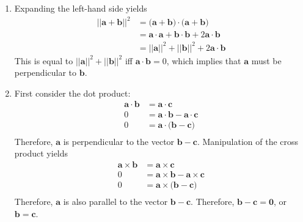 \item
\begin{enumerate}
\item Expanding the left-hand side yields
\begin{align*}
||\mathbf{a} + \mathbf{b}||^2 &= \big(\mathbf{a} + \mathbf{b}\big)\cdot\big(\mathbf{a} + \mathbf{b}\big) \\
&= \mathbf{a}\cdot\mathbf{a} + \mathbf{b}\cdot\mathbf{b} + 2\mathbf{a}\cdot\mathbf{b}\\
&= ||\mathbf{a}||^2 + ||\mathbf{b}||^2 + 2\mathbf{a}\cdot\mathbf{b}
\end{align*}
This is equal to $ ||\mathbf{a}||^2 + ||\mathbf{b}||^2$ iff $\mathbf{a}\cdot\mathbf{b}=0$, which implies that $\mathbf{a}$ must be perpendicular to $\mathbf{b}$.
\item First consider the dot product:
\begin{align*}
\mathbf{a}\cdot\mathbf{b} &= \mathbf{a}\cdot\mathbf{c} \\
0 &= \mathbf{a}\cdot\mathbf{b} - \mathbf{a}\cdot\mathbf{c} \\
0 &= \mathbf{a}\cdot\big(\mathbf{b} - \mathbf{c}\big) \\
\end{align*}
Therefore, $\mathbf{a}$ is perpendicular to the vector $\mathbf{b} - \mathbf{c}$. Manipulation of the cross product yields
\begin{align*}
\mathbf{a}\times\mathbf{b} &= \mathbf{a}\times\mathbf{c} \\
0 &= \mathbf{a}\times\mathbf{b} - \mathbf{a}\times\mathbf{c} \\
0 &= \mathbf{a}\times\big(\mathbf{b} - \mathbf{c}\big) \\
\end{align*}
Therefore, $\mathbf{a}$ is also parallel to the vector $\mathbf{b} - \mathbf{c}$. Therefore, $\mathbf{b} - \mathbf{c} = \mathbf{0}$, or $\mathbf{b} = \mathbf{c}$.
\end{enumerate}
\item
